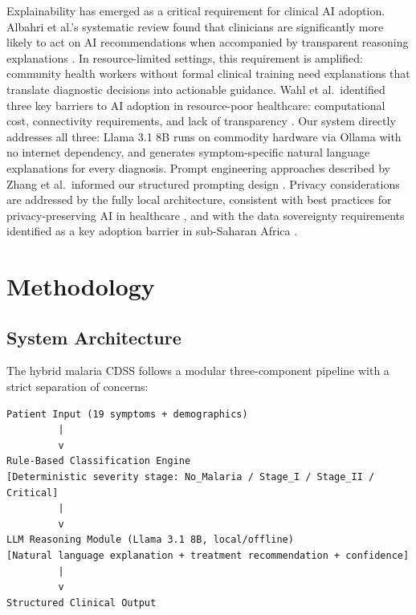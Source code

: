 \documentclass[12pt,a4paper]{article}
\begin{document}
Explainability has emerged as a critical requirement for clinical AI adoption. Albahri et al.'s systematic review found that clinicians are significantly more likely to act on AI recommendations when accompanied by transparent reasoning explanations \cite{ref8}. In resource-limited settings, this requirement is amplified: community health workers without formal clinical training need explanations that translate diagnostic decisions into actionable guidance. Wahl et al.\ identified three key barriers to AI adoption in resource-poor healthcare: computational cost, connectivity requirements, and lack of transparency \cite{ref20}. Our system directly addresses all three: Llama 3.1 8B runs on commodity hardware via Ollama \cite{ref9,ref13} with no internet dependency, and generates symptom-specific natural language explanations for every diagnosis. Prompt engineering approaches described by Zhang et al.\ informed our structured prompting design \cite{ref17}. Privacy considerations are addressed by the fully local architecture, consistent with best practices for privacy-preserving AI in healthcare \cite{ref30}, and with the data sovereignty requirements identified as a key adoption barrier in sub-Saharan Africa \cite{ref16}.

\section{Methodology}
\label{sec:methods}

\subsection{System Architecture}

The hybrid malaria CDSS follows a modular three-component pipeline with a strict separation of concerns:

\begin{lstlisting}[caption={System pipeline overview},label={lst:pipeline}]
Patient Input (19 symptoms + demographics)
         |
         v
Rule-Based Classification Engine
[Deterministic severity stage: No_Malaria / Stage_I / Stage_II / Critical]
         |
         v
LLM Reasoning Module (Llama 3.1 8B, local/offline)
[Natural language explanation + treatment recommendation + confidence]
         |
         v
Structured Clinical Output
\end{lstlisting}
\end{document}
